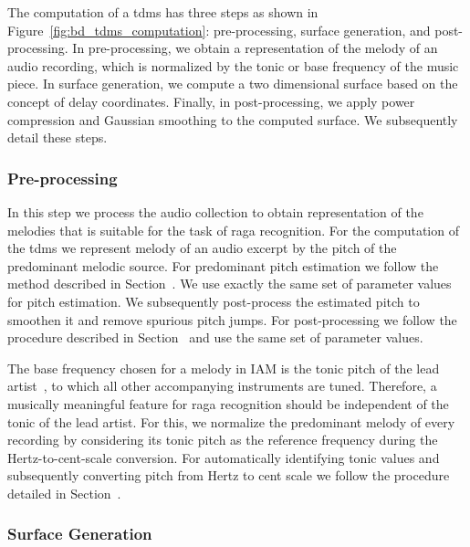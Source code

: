 The computation of a \gls{tdms} has three steps as shown in Figure~\ref{fig:bd_tdms_computation}: pre-processing, surface generation, and post-processing. In pre-processing, we obtain a representation of the melody of an audio recording, which is normalized by the tonic or base frequency of the music piece. In surface generation, we compute a two dimensional surface based on the concept of delay coordinates. Finally, in post-processing, we apply power compression and Gaussian smoothing to the computed surface. We subsequently detail these steps.

\subsubsection{Pre-processing}
\label{sec:tdms_preprocessing}

In this step we process the audio collection to obtain representation of the melodies that is suitable for the task of \gls{raga} recognition. For the computation of the \gls{tdms} we represent melody of an audio excerpt by the pitch of the predominant melodic source. For predominant pitch estimation we follow the method described in Section~. We use exactly the same set of parameter values for pitch estimation. We subsequently post-process the estimated pitch to smoothen it and remove spurious pitch jumps. For post-processing we follow the procedure described in Section~ and use the same set of parameter values.

The base frequency chosen for a melody in IAM is the tonic pitch of the lead artist~\cite{Gulati2014Tonic}, to which all other accompanying instruments are tuned. Therefore, a musically meaningful feature for \gls{raga} recognition should be independent of the tonic of the lead artist. For this, we normalize the predominant melody of every recording by considering its tonic pitch as the reference frequency during the Hertz-to-cent-scale conversion. For automatically identifying tonic values and subsequently converting pitch from Hertz to cent scale we follow the procedure detailed in Section~.


\subsubsection{Surface Generation}
\label{sec:tdms_surface_generation}

